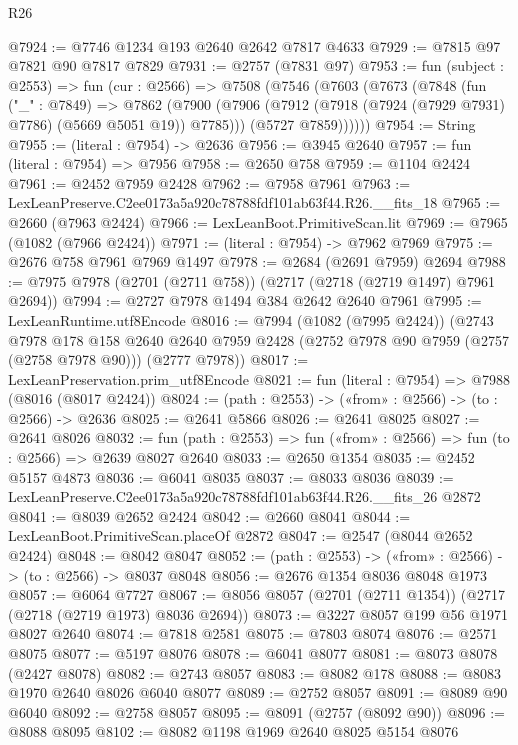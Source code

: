 \begin{lexlean}{R26}
\begin{coremodule}
@7924 := @7746 @1234 @193 @2640 @2642 @7817 @4633
@7929 := @7815 @97 @7821 @90 @7817 @7829
@7931 := @2757 (@7831 @97)
@7953 := fun (subject : @2553) =>
  fun (cur : @2566) =>
  @7508
    (@7546
      (@7603
        (@7673
          (@7848
            (fun ("_" : @7849) =>
            @7862
              (@7900 (@7906 (@7912 (@7918 (@7924 (@7929 @7931) @7786) (@5669 @5051 @19)) @7785)))
              (@5727 @7859))))))
@7954 := String
@7955 := (literal : @7954) -> @2636
@7956 := @3945 @2640
@7957 := fun (literal : @7954) => @7956
@7958 := @2650 @758
@7959 := @1104 @2424
@7961 := @2452 @7959 @2428
@7962 := @7958 @7961
@7963 := LexLeanPreserve.C2ee0173a5a920c78788fdf101ab63f44.R26.__fits_18
@7965 := @2660 (@7963 @2424)
@7966 := LexLeanBoot.PrimitiveScan.lit
@7969 := @7965 (@1082 (@7966 @2424))
@7971 := (literal : @7954) -> @7962 @7969
@7975 := @2676 @758 @7961 @7969 @1497
@7978 := @2684 (@2691 @7959) @2694
@7988 := @7975 @7978 (@2701 (@2711 @758)) (@2717 (@2718 (@2719 @1497) @7961 @2694))
@7994 := @2727 @7978 @1494 @384 @2642 @2640 @7961
@7995 := LexLeanRuntime.utf8Encode
@8016 := @7994
    (@1082 (@7995 @2424))
    (@2743
      @7978
      @178
      @158
      @2640
      @2640
      @7959
      @2428
      (@2752 @7978 @90 @7959 (@2757 (@2758 @7978 @90)))
      (@2777 @7978))
@8017 := LexLeanPreservation.prim_utf8Encode
@8021 := fun (literal : @7954) => @7988 (@8016 (@8017 @2424))
@8024 := (path : @2553) -> («from» : @2566) -> (to : @2566) -> @2636
@8025 := @2641 @5866
@8026 := @2641 @8025
@8027 := @2641 @8026
@8032 := fun (path : @2553) => fun («from» : @2566) => fun (to : @2566) => @2639 @8027 @2640
@8033 := @2650 @1354
@8035 := @2452 @5157 @4873
@8036 := @6041 @8035
@8037 := @8033 @8036
@8039 := LexLeanPreserve.C2ee0173a5a920c78788fdf101ab63f44.R26.__fits_26 @2872
@8041 := @8039 @2652 @2424
@8042 := @2660 @8041
@8044 := LexLeanBoot.PrimitiveScan.placeOf @2872
@8047 := @2547 (@8044 @2652 @2424)
@8048 := @8042 @8047
@8052 := (path : @2553) -> («from» : @2566) -> (to : @2566) -> @8037 @8048
@8056 := @2676 @1354 @8036 @8048 @1973
@8057 := @6064 @7727
@8067 := @8056 @8057 (@2701 (@2711 @1354)) (@2717 (@2718 (@2719 @1973) @8036 @2694))
@8073 := @3227 @8057 @199 @56 @1971 @8027 @2640
@8074 := @7818 @2581
@8075 := @7803 @8074
@8076 := @2571 @8075
@8077 := @5197 @8076
@8078 := @6041 @8077
@8081 := @8073 @8078 (@2427 @8078)
@8082 := @2743 @8057
@8083 := @8082 @178
@8088 := @8083 @1970 @2640 @8026 @6040 @8077
@8089 := @2752 @8057
@8091 := @8089 @90 @6040
@8092 := @2758 @8057
@8095 := @8091 (@2757 (@8092 @90))
@8096 := @8088 @8095
@8102 := @8082 @1198 @1969 @2640 @8025 @5154 @8076

\end{coremodule}
\end{lexlean}
